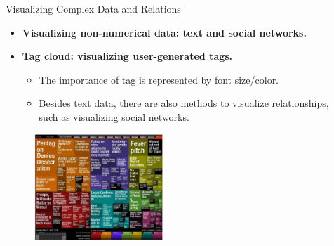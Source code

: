 \begin{frame}{Visualizing Complex Data and Relations}
  \centering
  \begin{itemize}
  \item \textbf{Visualizing non-numerical data: text and social networks.}
  \item \textbf{Tag cloud: visualizing user-generated tags.}
    \begin{itemize}
    \item The importance of tag is represented by font size/color.
    \item Besides text data, there are also methods to visualize relationships, \\ such as visualizing social networks.
    \end{itemize}
  \end{itemize}
  \includegraphics[width=7cm,height=4cm]{img/google_news.png}
\end{frame}
